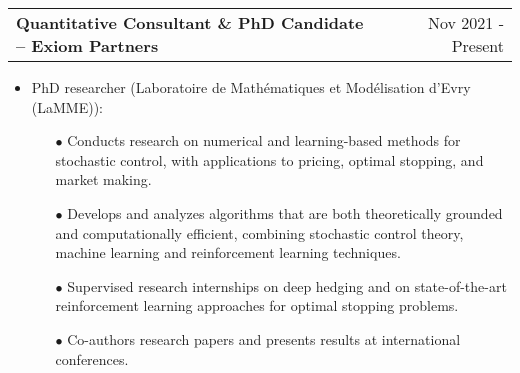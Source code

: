 \documentclass[a4paper,12pt]{article}
\makeatletter
\newenvironment{joblong}[2]
    {
    \begin{tabularx}{\linewidth}{@{}l X r@{}}
    \textbf{#1} & \hfill &  #2 \\[3.75pt]
    \end{tabularx}
    \begin{minipage}[t]{\linewidth}
    \begin{itemize}[nosep,after=\strut, leftmargin=1em, itemsep=3pt,label=--]
    }
    {
    \end{itemize}
    \end{minipage}    
    }
\makeatother
\begin{document}
	\begin{joblong}{Quantitative Consultant \& PhD Candidate -- Exiom Partners}{Nov 2021 - Present}
	\item PhD researcher (Laboratoire de Mathématiques et Modélisation d'Evry (LaMME)):
		\begin{itemize}
			\item[$\bullet$] Conducts research on numerical and learning-based methods for stochastic control, with applications to pricing, optimal stopping, and market making.
			\item[$\bullet$] Develops and analyzes algorithms that are both theoretically grounded and computationally efficient, combining stochastic control theory, machine learning and reinforcement learning techniques.
			\item[$\bullet$] Supervised research internships on deep hedging and on state-of-the-art reinforcement learning approaches for optimal stopping problems.
			\item[$\bullet$] Co-authors research papers and presents results at international conferences. \\
		\end{itemize}
		

\end{joblong}
\end{document}
